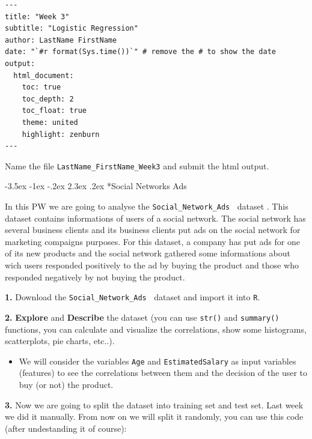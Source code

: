 \documentclass[]{book}
\makeatletter
\newenvironment{rmdblock}[1]
  {\begin{shaded*}
  \begin{itemize}
  \renewcommand{\labelitemi}{
    \raisebox{-.7\height}[0pt][0pt]{
      {\setkeys{Gin}{width=2em,keepaspectratio}\texttt{[image: img/icons/\#1]}}
    }
  }
  \item
  }
  {
  \end{itemize}
  \end{shaded*}
  }
\newenvironment{rmdtip}
  {\begin{rmdblock}{tip}}
  {\end{rmdblock}}
\renewcommand\section{\@startsection {section}{1}{\z@}%
                                   {-3.5ex \@plus -1ex \@minus -.2ex}%
                                   {2.3ex \@plus.2ex}%
                                   {\normalfont\Large\bfseries\color{ForestGreen}}}
\theoremstyle{definition}
\theoremstyle{definition}
\theoremstyle{definition}
\theoremstyle{remark}
\makeatother
\begin{document}
\begin{verbatim}
---
title: "Week 3"
subtitle: "Logistic Regression"
author: LastName FirstName
date: "`#r format(Sys.time())`" # remove the # to show the date
output:
  html_document:
    toc: true
    toc_depth: 2
    toc_float: true
    theme: united
    highlight: zenburn
---
\end{verbatim}

Name the file \texttt{LastName\_FirstName\_Week3} and submit the html
output.

\section*{Social Networks Ads}\label{social-networks-ads}

In this PW we are going to analyse the \texttt{Social\_Network\_Ads}
\textcolor{white}{[}\faTable\textcolor{white}{]}dataset . This dataset
contains informations of users of a social network. The social network
has several business clients and its business clients put ads on the
social network for marketing compaigns purposes. For this dataset, a
company has put ads for one of its new products and the social network
gathered some informations about wich users responded positively to the
ad by buying the product and those who responded negatively by not
buying the product.

\textbf{1.} Download the \texttt{Social\_Network\_Ads}
\textcolor{white}{[}\faTable\textcolor{white}{]}dataset and import it
into \texttt{R}.

\textbf{2.} \textbf{Explore} and \textbf{Describe} the dataset (you can
use \texttt{str()} and \texttt{summary()} functions, you can calculate
and visualize the correlations, show some histograms, scatterplots, pie
charts, etc..).

\begin{rmdtip}
We will consider the variables \texttt{Age} and \texttt{EstimatedSalary}
as input variables (features) to see the correlations between them and
the decision of the user to buy (or not) the product.
\end{rmdtip}

\textbf{3.} Now we are going to split the dataset into training set and
test set. Last week we did it manually. From now on we will split it
randomly, you can use this code (after undestanding it of course):
\end{document}
